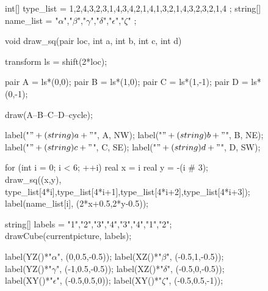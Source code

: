 \documentclass[../gatm_answers.tex]{subfiles}
\begin{document}
\begin{figure}[h]
	\begin{center}
		\begin{minipage}[b]{0.6\textwidth}
			\centering
			\begin{asy}[width=0.8\textwidth]
			int[] type_list = {
			1,2,4,3,2,3,1,4,3,4,2,1,4,1,3,2,1,4,3,2,3,2,1,4
			};
			string[] name_list = { "$\alpha$","$\beta$","$\gamma$","$\delta$","$\epsilon$","$\zeta$" };
			
			void draw_sq(pair loc, int a, int b, int c, int d) {
			
			transform ls = shift(2*loc);
			
			pair A = ls*(0,0);
			pair B = ls*(1,0);
			pair C = ls*(1,-1);
			pair D = ls*(0,-1);
			
			draw(A--B--C--D--cycle);
			
			label("$" + (string) a + "$", A, NW);
			label("$" + (string) b + "$", B, NE);
			label("$" + (string) c + "$", C, SE);
			label("$" + (string) d + "$", D, SW);
			
			}
			
			for (int i = 0; i < 6; ++i) {
				real x = i%
				real y = -(i # 3);
				draw_sq((x,y), type_list[4*i],type_list[4*i+1],type_list[4*i+2],type_list[4*i+3]);
				label(name_list[i], (2*x+0.5,2*y-0.5));
			}
			\end{asy}
		\end{minipage}
		\hfill
		\begin{minipage}[b]{0.3\textwidth}
			\begin{asy}[width=0.9\textwidth]
			string[] labels = {"1","2","3","4","3","4","1","2"};
			drawCube(currentpicture, labels);
			
			label(YZ()*"$\alpha$", (0,0.5,-0.5));
			label(XZ()*"$\beta$", (-0.5,1,-0.5));
			label(YZ()*"$\gamma$", (-1,0.5,-0.5));
			label(XZ()*"$\delta$", (-0.5,0,-0.5));
			label(XY()*"$\epsilon$", (-0.5,0.5,0));
			label(XY()*"$\zeta$", (-0.5,0.5,-1));
			\end{asy}
		\end{minipage}
	\end{center}
	\vspace*{-2\baselineskip}
	\begin{center}
		\begin{minipage}[t]{0.6\textwidth}
			\label{fig:six_labelings}
		\end{minipage}
		\hfill
		\begin{minipage}[t]{0.3\textwidth}
			\label{fig:labelings_appear}
		\end{minipage}
	\end{center}
	\vspace*{-2\baselineskip}
\end{figure}
\end{document}

